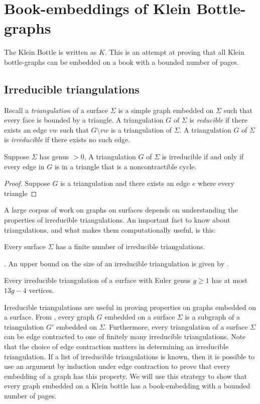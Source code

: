 \section{Book-embeddings of Klein Bottle-graphs}
The Klein Bottle is written as $K$.
This is an attempt at proving that all Klein bottle-graphs can be embedded on a book with a bounded number of pages.

\subsection{Irreducible triangulations}
Recall a \textit{triangulation} of a surface $\Sigma$ is a simple graph embedded on $\Sigma$ such that every face is bounded by a triangle. A triangulation $G$ of $\Sigma$ is \textit{reducible} if there exists an edge $vw$ such that $G \setminus vw$ is a triangulation of $\Sigma$. A triangulation $G$ of $\Sigma$ is \textit{irreducible} if there exists no such edge. 

\begin{lemma}
    Suppose $\Sigma$ has genus $> 0$, A triangulation $G$ of $\Sigma$ is irreducible if and only if every edge in $G$ is in a triangle that is a noncontractible cycle.
\end{lemma}

\begin{proof}
    Suppose $G$ is a triangulation and there exists an edge $e$ where every triangle 
\end{proof}

A large corpus of work on graphs on surfaces depends on understanding the properties of irreducible triangulations. An important fact to know about triangulations, and what makes them computationally useful, is this:

\begin{theorem}
    Every surface $\Sigma$ has a finite number of irreducible triangulations.
\end{theorem}

. An upper bound on the size of an irreducible triangulation is given by \textcite{joretIrreducibleTriangulationsAre2010}.

\begin{theorem}\textcite{joretIrreducibleTriangulationsAre2010}
    Every irreducible triangulation of a surface with Euler genus $g \geq 1$ has at most $13g - 4$ vertices. 
\end{theorem}

Irreducible triangulations are useful in proving properties on graphs embedded on a surface. From , every graph $G$ embedded on a surface $\Sigma$ is a subgraph of a triangulation $G'$ embedded on $\Sigma$. Furthermore, every triangulation of a surface $\Sigma$ can be edge contracted to one of finitely many irreducible triangulations. Note that the choice of edge contraction matters in determining an irreducible triangulation. If a list of irreducible triangulations is known, then it is possible to use an argument by induction under edge contraction to prove that every embedding of a graph has this property. We will use this strategy to show that every graph embedded on a Klein bottle has a book-embedding with a bounded number of pages. 

